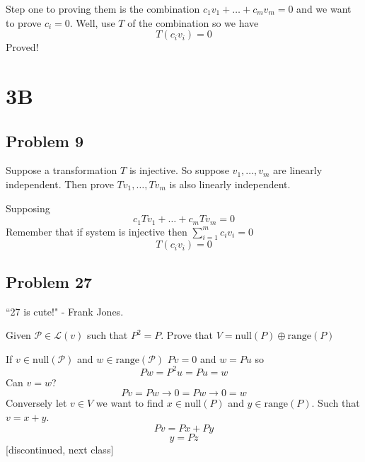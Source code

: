 \documentclass[letter]{article}
\begin{document}
Step one to proving them is the combination
$c_1 v_1 + \ldots + c_m v_m = 0$ and we want to prove $c_i = 0$. Well, use $T$ of the combination so we have
\[
T (c_i v_i) = 0 
\] 
Proved! 

\section{3B}
\subsection{Problem 9} 
Suppose a transformation $T$ is injective. So suppose $v_1, \ldots, v_m$ are linearly independent. Then prove $Tv_1, \ldots, Tv_m $ is also linearly independent. 

Supposing  \[
c_1 T v_1 + \ldots + c_m T v_m = 0
\] 
Remember that if system is injective then $\sum_{i=1}^{m} c_i v_i = 0$
\[
T(c_i v_i) = 0
\]

\subsection{Problem 27} 
``27 is cute!" - Frank Jones. 

Given $\mathcal{P} \in  \mathcal{L}(v)$ such that $P^2 = P$. Prove that 
$V = \text{null}(P) \oplus \text{range}(P)$

If $v \in \text{null}(\mathcal P)$ and $w \in  \text{range} (\mathcal P)$ 
$Pv = 0$ and $w = P u $ so 
 \[
P w = P^2 u = P u = w
\]
Can $v = w$? 
\[
Pv = P w \to 0 = Pw \to 0 = w
\]
Conversely let $v \in V$ we want to find $x \in \text{null}(P)$ and $y \in \text{range}(P)$. Such that $v = x+y$. 
\[
Pv = Px + Py
\]
\[
 y = P z
\]
[discontinued, next class]
\end{document}
